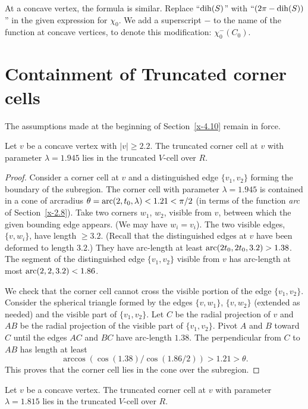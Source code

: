 At a concave vertex, the formula is similar.  Replace ``$\operatorname{dih}(S)$''
with $``(2\pi-\operatorname{dih}(S))$'' in the given expression for $\chi_0$.
We add a superscript $-$ to the name of the function at concave
vertices, to denote this modification: $\chi^-_0(C_0)$.

\section{Containment of Truncated corner cells}

The assumptions made at the beginning of Section~\ref{x-4.10} remain in
force.

\begin{lemma}
Let $v$ be a concave vertex with $|v|\ge2.2$. The truncated
corner cell at $v$ with parameter $\lambda=1.945$ lies in the truncated
$V$-cell over $R$.
\end{lemma}

\begin{proof}
Consider a  corner cell at $v$ and a distinguished edge $\{v_1,v_2\}$
forming the boundary of the subregion. The corner cell with parameter
$\lambda=1.945$ is contained in a cone of arcradius
    $\theta = \operatorname{arc}(2,t_0,\lambda)< 1.21 <\pi/2$
(in terms of the function {\it arc\/} of Section~\ref{x-2.8}). Take two
corners $w_1$, $w_2$, visible from $v$, between which the given bounding
edge appears. (We may have $w_i=v_i$). The two visible edges, $\{v,w_i\}$,
have length $\ge 3.2$. (Recall that the distinguished edges at $v$ have
been deformed to length $3.2$.) They have arc-length at least
$\operatorname{arc}(2t_0,2t_0,3.2)>1.38$. The segment of the distinguished edge
$\{v_1,v_2\}$ visible from $v$ has arc-length at most
$\operatorname{arc}(2,2,3.2)<1.86$.

We check that the corner cell cannot cross the visible portion of
the edge $\{v_1,v_2\}$. Consider the spherical triangle formed by
the edges $\{v,w_1\}$, $\{v,w_2\}$ (extended as needed) and the
visible part of $\{v_1,v_2\}$. Let $C$ be the radial projection of
$v$ and $AB$ be the radial projection of the visible part of
$\{v_1,v_2\}$. Pivot $A$ and $B$ toward $C$ until the edges $AC$ and
$BC$ have arc-length $1.38$.  The perpendicular from $C$ to $AB$
has length at least
    $$\arccos(\cos(1.38)/\cos(1.86/2))>1.21>\theta.$$
This proves that the corner cell lies in the cone over the subregion.
\end{proof}

\begin{lemma}
Let $v$ be a concave vertex. The truncated corner cell at $v$ with
parameter $\lambda=1.815$ lies in the truncated $V$-cell over $R$.
\end{lemma}

